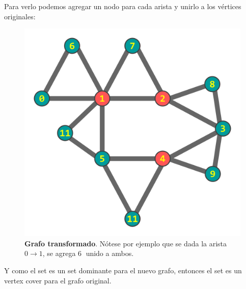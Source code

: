 \documentclass[../tp3_grupo404.tex]{subfiles}
\begin{document}
Para verlo podemos agregar un nodo para cada arista y unirlo a los vértices originales:
\begin{figure}[H]
    \centering
    \includegraphics[width=0.9\linewidth,angle=0,origin=c]{out/ejB2.png}
    \caption{\label{ejB2} \textbf{Grafo transformado}. Nótese por ejemplo que se dada
    la arista $0\rightarrow 1$, se agrega \textcircled{6} unido a ambos.}
\end{figure}

Y como el set es un set dominante para el nuevo grafo, entonces el set es un vertex cover
para el grafo original.

\end{document}

